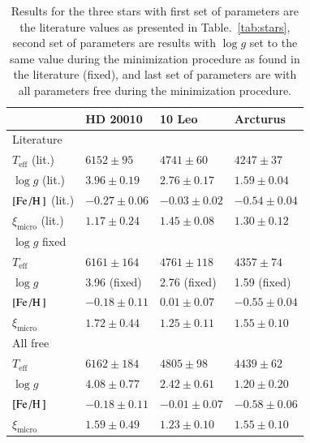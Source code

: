 \documentclass{aa}
\begin{document}
\begin{table}[htb!]
    \caption{Results for the three stars with first set of parameters are the
             literature values as presented in Table.~\ref{tab:stars}, second
             set of parameters are results with $\log g$ set to the same value
             during the minimization procedure as found in the literature
             (fixed), and last set of parameters are with all parameters free
             during the minimization procedure.}
    \label{tab:results}
    \centering
    \begin{tabular}{llll}
      \hline\hline
                                    & HD 20010          &  10 Leo           &  Arcturus        \\
      \hline
        Literature                  &                   &                   &                  \\
        $T_\mathrm{eff}$ (lit.)     & $6152 \pm  95$    &  $4741 \pm  60$   & $4247 \pm 37$   \\
        $\log g$ (lit.)             & $3.96 \pm 0.19$   &  $2.76 \pm 0.17$  & $1.59 \pm 0.04$  \\
        $[\ion{Fe}/\ion{H}]$ (lit.) & $-0.27 \pm 0.06$  &  $-0.03 \pm 0.02$ & $-0.54 \pm 0.04$ \\
        $\xi_\mathrm{micro}$ (lit.) & $1.17 \pm 0.24$   &  $1.45 \pm 0.08$  & $1.30 \pm 0.12$  \\
      \hline
        $\log g$ fixed              &                   &                   &                  \\
        $T_\mathrm{eff}$            & $6161 \pm 164$    &  $4761 \pm 118$   & $4357 \pm  74$   \\
        $\log g$                    & 3.96 (fixed)      &  2.76 (fixed)     & 1.59 (fixed)     \\
        $[\ion{Fe}/\ion{H}]$        & $-0.18 \pm 0.11$  &  $ 0.01 \pm 0.07$ & $-0.55 \pm 0.04$ \\
        $\xi_\mathrm{micro}$        & $1.72 \pm 0.44$   &  $1.25 \pm 0.11$  & $1.55 \pm 0.10$  \\
      \hline
        All free                    &                   &                   &                  \\
        $T_\mathrm{eff}$            & $6162 \pm 184$    &  $4805 \pm  98$   & $4439 \pm  62$   \\
        $\log g$                    & $4.08 \pm 0.77$   &  $2.42 \pm 0.61$  & $1.20 \pm 0.20$  \\
        $[\ion{Fe}/\ion{H}]$        & $-0.18 \pm 0.11$  &  $-0.01 \pm 0.07$ & $-0.58 \pm 0.06$ \\
        $\xi_\mathrm{micro}$        & $1.59 \pm 0.49$   &  $1.23 \pm 0.10$  & $1.55 \pm 0.10$  \\
        \hline\hline
    \end{tabular}
\end{table}
\end{document}
